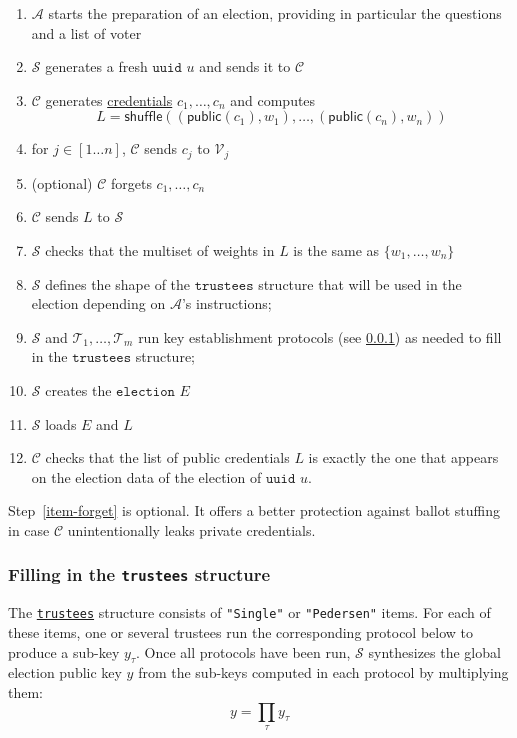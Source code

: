 \documentclass[a4paper]{article}
\newcommand{\public}{\textsf{public}}
\newcommand{\shuffle}{\textsf{shuffle}}
\newcommand{\uuid}{\texttt{uuid}}
\newcommand{\election}{\texttt{election}}
\begin{document}
\begin{enumerate}
\item $\mathcal{A}$ starts the preparation of an election, providing
  in particular the questions and a list of voter
\item $\mathcal{S}$ generates a fresh \hyperref[basic-types]{$\uuid$} $u$ and
  sends it to $\mathcal{C}$
\item $\mathcal{C}$ generates \hyperref[credentials]{credentials}
  $c_1,\dots,c_n$ and computes
  \[L=\shuffle((\public(c_1),w_1),\dots,(\public(c_n),w_n))\]
\item for $j\in[1\dots n]$, $\mathcal{C}$ sends $c_j$ to $\mathcal{V}_j$
\item \label{item-forget} (optional) $\mathcal{C}$ forgets $c_1,\dots,c_n$
 \item $\mathcal{C}$ sends $L$ to $\mathcal{S}$
 \item $\mathcal{S}$ checks that the multiset of weights in $L$ is the
   same as $\{w_1,\dots,w_n\}$
 \item $\mathcal{S}$ defines the shape of the
   \hyperref[trustees]{$\texttt{trustees}$} structure that will be
   used in the election depending on $\mathcal{A}$'s instructions;
 \item $\mathcal{S}$ and $\mathcal{T}_1,\dotsc,\mathcal{T}_m$ run key
   establishment protocols (see \ref{process-filling-trustees}) as
     needed to fill in the $\texttt{trustees}$ structure;
\item $\mathcal{S}$ creates the \hyperref[elections]{$\election$} $E$
\item $\mathcal{S}$ loads $E$ and $L$ %
\item $\mathcal{C}$ checks that the list of public credentials $L$
  is exactly the one that appears on the election data of the election of
  {$\uuid$} $u$.
\end{enumerate}
Step~\ref{item-forget} is optional. It offers a better protection
against ballot stuffing in case $\mathcal{C}$ unintentionally leaks
private credentials.

\subsubsection{Filling in the \texttt{trustees} structure}
\label{process-filling-trustees}

The \hyperref[trustees]{\texttt{trustees}} structure consists of
\texttt{"Single"} or \texttt{"Pedersen"} items. For each of these
items, one or several trustees run the corresponding protocol below to
produce a sub-key $y_\tau$. Once all protocols have been run,
$\mathcal{S}$ synthesizes the global election public key $y$ from the
sub-keys computed in each protocol by multiplying them:
\[
  y=\prod_\tau y_\tau
\]
\end{document}
